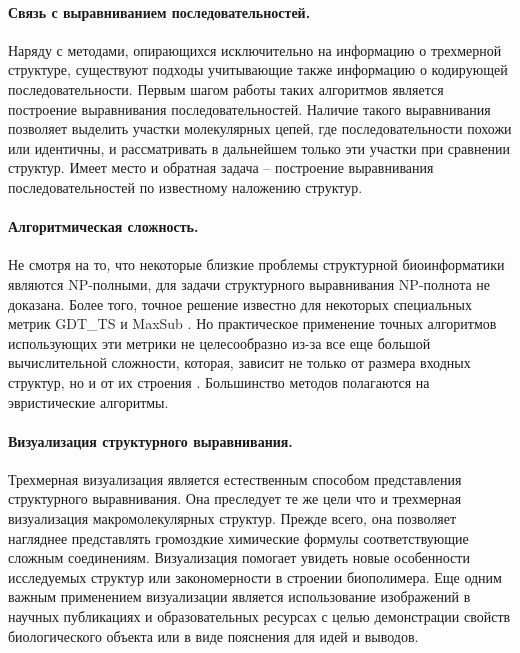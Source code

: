 \documentclass[a4paper, 12pt, titlepage, utf8]{extarticle}
\begin{document}
\paragraph{Связь с выравниванием последовательностей.}
Наряду с методами, опирающихся исключительно на информацию о трехмерной структуре, существуют подходы учитывающие также информацию о кодирующей последовательности. Первым шагом работы таких алгоритмов является построение выравнивания последовательностей. Наличие такого выравнивания позволяет выделить участки молекулярных цепей, где последовательности похожи или идентичны, и рассматривать в дальнейшем только эти участки при сравнении структур. Имеет место и обратная задача -- построение выравнивания последовательностей по известному наложению структур.

\paragraph{Алгоритмическая сложность.}
Не смотря на то, что некоторые близкие проблемы структурной биоинформатики являются NP-полными, для задачи структурного выравнивания NP-полнота не доказана. Более того, точное решение известно для некоторых специальных метрик GDT\_TS \cite{wiki-2} и MaxSub \cite{wiki-11}. Но практическое применение точных алгоритмов использующих эти метрики не целесообразно из-за все еще большой вычислительной сложности, которая, зависит не только от размера входных структур, но и от их строения  \cite{wiki-12}. Большинство методов полагаются на эвристические алгоритмы.

\paragraph{Визуализация структурного выравнивания.}
Трехмерная визуализация является естественным способом представления структурного выравнивания. Она преследует те же цели что и трехмерная визуализация макромолекулярных структур. Прежде всего, она позволяет нагляднее представлять громоздкие химические формулы соответствующие сложным соединениям. Визуализация помогает увидеть новые особенности исследуемых структур или закономерности в строении биополимера. Еще одним важным применением визуализации является использование изображений в научных публикациях и образовательных ресурсах с целью демонстрации свойств биологического объекта или в виде пояснения для идей и выводов.


\end{document}
